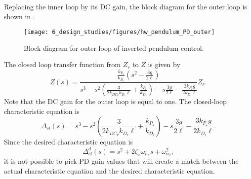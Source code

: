 Replacing the inner loop by its DC gain, the block diagram for the outer loop is shown in .
%
\begin{figure}[htbp]
   	\centering
   	\texttt{[image: 6\_design\_studies/figures/hw\_pendulum\_PD\_outer]} 
   	\caption{Block diagram for outer loop of inverted pendulum control.}
   	\label{fig:hw_pendulum_PD_outer}
\end{figure}
%
The closed loop transfer function from $Z_r$ to $Z$ is given by
\[
Z(s) = \frac{\frac{k_{P_z}}{k_{D_z}}(s^2-\frac{3g}{2\ell})}{s^3-s^2 (\frac{3}{2 k_{DC_\theta} k_{D_z} \ell} + \frac{ k_{P_z}}{k_{D_z}}) - s \frac{3 g}{2 \ell} - \frac{3 k_{P_z} g}{2 k_{D_z} \ell}} Z_r.
\]
Note that the DC gain for the outer loop is equal to one.
The closed-loop characteristic equation is 
\[
\Delta_{cl}(s) = s^3-s^2 (\frac{3}{2 k_{DC_\theta} k_{D_z} \ell} + \frac{ k_{P_z}}{k_{D_z}}) - s \frac{3 g}{2 \ell} - \frac{3 k_{P_z} g}{2 k_{D_z} \ell}.
\]
Since the desired characteristic equation is 
\begin{equation}\label{eq:delta_cl_d_pendulum_outer}
\Delta_{cl}^d(s) = s^2 + 2\zeta_z\omega_{n_z}s + \omega_{n_z}^2,
\end{equation}
it is not possible to pick PD gain values that will create a match between the actual characteristic equation and the desired characteristic equation.  

